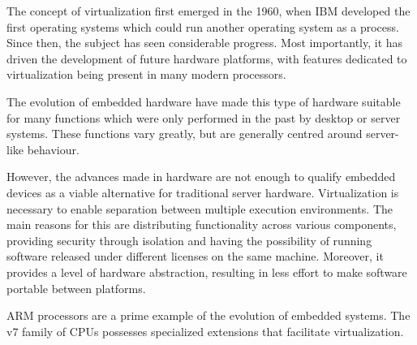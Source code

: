 
The concept of virtualization first emerged in the 1960, when IBM developed the first operating systems which could run another operating system as a process\cite{IBM}. Since then, the subject has seen considerable progress. Most importantly, it has driven the development of future hardware platforms, with features dedicated to virtualization being present in many modern processors.

The evolution of embedded hardware have made this type of hardware suitable for many functions which were only performed in the past by desktop or server systems. These functions vary greatly, but are generally centred around server-like behaviour.

However, the advances made in hardware are not enough to qualify embedded devices as a viable alternative for traditional server hardware. Virtualization is necessary to enable separation between multiple execution environments. The main reasons for this are distributing functionality across various components, providing security through isolation and having the possibility of running software released under different licenses on the same machine. Moreover, it provides a level of hardware abstraction, resulting in less effort to make software portable between platforms.

ARM processors are a prime example of the evolution of embedded systems. The v7 family of CPUs possesses specialized extensions that facilitate virtualization.
